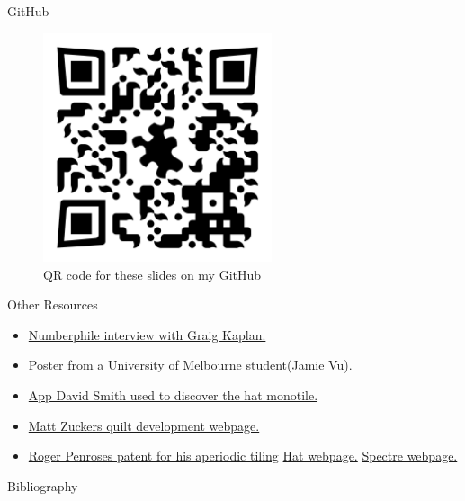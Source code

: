 \documentclass{beamer}
\begin{document}
\begin{frame}{GitHub}
    \begin{figure}
        \centering
        \includegraphics[width=0.6\textwidth]{images/qr-codes/tilling-presentation-github.png}
        \caption{QR code for these slides on my GitHub}
        \label{fig:github-qrcode}
    \end{figure}
\end{frame}

\begin{frame}[allowframebreaks]{Other Resources}
    \begin{itemize}
        \item \href{https://www.youtube.com/watch?v=_ZS3Oqg1AX0&ab_channel=Numberphile}{Numberphile interview with Graig Kaplan.}
        \item \href{https://ms.unimelb.edu.au/__data/assets/pdf_file/0011/5218382/vujamie_296128_22162633_Jamie_Vu_Poster_final.pdf}{Poster from a University of Melbourne student(Jamie Vu).}
        \item \href{https://cs.uwaterloo.ca/~csk/spectre/app.html}{App David Smith used to discover the hat monotile.}
        \item \href{https://mzucker.github.io/2022/11/13/penrose-tiling-quilt.html}{Matt Zuckers quilt development webpage.}
        \item \href{https://patentimages.storage.googleapis.com/f2/9b/08/1b79cb4e4c0f3f/US4133152.pdf}{Roger Penroses patent for his aperiodic tiling}
        \href{https://cs.uwaterloo.ca/~csk/hat/}{Hat webpage.}
        \href{https://cs.uwaterloo.ca/~csk/spectre/}{Spectre webpage.}
    \end{itemize}
\end{frame}

    

\begin{frame}[allowframebreaks]{Bibliography}
  \footnotesize
  
  
\end{frame}





\end{document}
